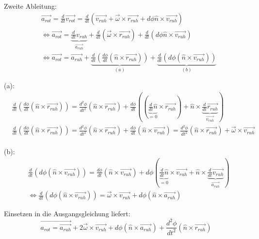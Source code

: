 \documentclass[a4paper,german,12pt,smallheadings]{scrartcl}
\begin{document}
Zweite Ableitung:
\begin{align*}
& \vec{a_{rot}}=\frac{d}{dt}\vec{v_{rot}}=\frac{d}{dt} \left(\vec{v_{ruh}}+\vec{\omega} \times \vec{r_{ruh}}+d\phi\hat{n} \times \vec{v_{ruh}}\right)\\
& \Leftrightarrow \vec{a_{rot}}=\underbrace{\frac{d}{dt}{v_{ruh}}}_{\vec{a_{ruh}}}+\frac{d}{dt}\left(\vec{\omega} \times \vec{r_{ruh}}\right)+\frac{d}{dt}\left(d\phi\hat{n} \times \vec{v_{ruh}}\right)\\
& \Leftrightarrow \vec{a_{rot}}=\vec{a_{ruh}}+\underbrace{\frac{d}{dt}\left(\frac{d\phi}{dt}\left(\hat{n}\times\vec{r_{ruh}}\right)\right)}_{(a)}+\underbrace{\frac{d}{dt}\left(d\phi\left(\hat{n}\times\vec{v_{ruh}}\right)\right)}_{(b)}
\end{align*}

(a):
\begin{align*}
& \frac{d}{dt}\left(\frac{d\phi}{dt}\left(\hat{n}\times\vec{r_{ruh}}\right)\right)=\frac{d^2\phi}{dt^2}\left(\hat{n}\times\vec{r_{ruh}}\right)+\frac{d\phi}{dt}\left(\left(\underbrace{\frac{d}{dt}\hat{n}}_{=0}\times\vec{r_{ruh}}\right)+\hat{n}\times\underbrace{\frac{d}{dt}\vec{r_{ruh}}}_{\vec{v_{ruh}}}\right)\\
& \frac{d}{dt}\left(\frac{d\phi}{dt}\left(\hat{n}\times\vec{r_{ruh}}\right)\right)=\frac{d^2\phi}{dt^2}\left(\hat{n}\times\vec{r_{ruh}}\right)+\frac{d\phi}{dt}\left(\hat{n}\times\vec{v_{ruh}}\right)=\frac{d^2\phi}{dt^2}\left(\hat{n}\times\vec{r_{ruh}}\right)+\vec{\omega}\times\vec{v_{ruh}}
\end{align*}
\\

(b):
\begin{align*}
& \frac{d}{dt}\left(d\phi\left(\hat{n}\times\vec{v_{ruh}}\right)\right)=\frac{d\phi}{dt}\left(\hat{n}\times\vec{v_{ruh}}\right)+d\phi\left(\underbrace{\frac{d}{dt}\hat{n}}_{=0}\times\vec{v_{ruh}}+\hat{n}\times\underbrace{\frac{d}{dt}\vec{v_{ruh}}}_{\vec{a_{ruh}}}\right)\\
& \Leftrightarrow \frac{d}{dt}\left(d\phi\left(\hat{n}\times\vec{v_{ruh}}\right)\right)=\vec{\omega}\times\vec{v_{ruh}}+d\phi\left(\hat{n}\times\vec{a_{ruh}}\right)
\end{align*}

Einsetzen in die Ausgangsgleichung liefert:
\begin{equation*}
\vec{a_{rot}=\vec{a_{ruh}}}+2\vec{\omega}\times\vec{v_{ruh}}+d\phi\left(\hat{n}\times\vec{a_{ruh}}\right)+\frac{d^2\phi}{dt^2}\left(\hat{n}\times\vec{r_{ruh}}\right)
\end{equation*}
\end{document}
